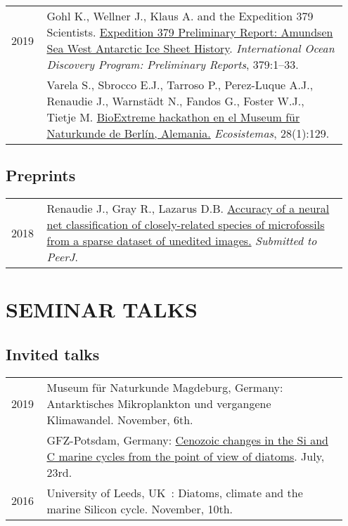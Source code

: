 \documentclass[11pt, a4paper]{article}
\makeatletter
\newcommand\fnoteref[1]{\protected@xdef\@theenmark{\ref{#1}}\@endnotemark}
\makeatother
\begin{document}
\begin{longtable}{@{}p{0.1\linewidth} P{0.85\linewidth}@{}}
2019 & Gohl K., Wellner J., Klaus A. and the Expedition 379 Scientists\fnoteref{exp379scientists}. \href{http://publications.iodp.org/preliminary_report/379/index.html}{Expedition 379 Preliminary Report: Amundsen Sea West Antarctic Ice Sheet History}. \textit{International Ocean Discovery Program: Preliminary Reports}, 379:1--33.\\
    & Varela S., Sbrocco E.J., Tarroso P., Perez-Luque A.J., Renaudie J., Warnst\"{a}dt N., Fandos G., Foster W.J., Tietje M. \href{http://dx.doi.org/10.7818/ECOS.1707}{BioExtreme hackathon en el Museum f\"{u}r Naturkunde de Berlín, Alemania.} \textit{Ecosistemas}, 28(1):129.\\
\end{longtable}

\subsection{Preprints}
\begin{longtable}{@{}p{0.1\linewidth} P{0.85\linewidth}@{}}
2018 & Renaudie J., Gray R., Lazarus D.B. \href{https://peerj.com/preprints/27328/}{Accuracy of a neural net classification of closely-related species of microfossils from a sparse dataset of unedited images.} \textit{Submitted to PeerJ}.\\
\end{longtable}

\section{SEMINAR TALKS}
\subsection{Invited talks}
\begin{longtable}{@{}p{0.1\linewidth} P{0.85\linewidth}@{}}
2019 & Museum f\"{u}r Naturkunde Magdeburg, Germany: Antarktisches Mikroplankton und vergangene Klimawandel. November, 6th.\\
    & GFZ-Potsdam, Germany: \href{http://plannapus.github.io/data/20190723Potsdam.pdf}{Cenozoic changes in the Si and C marine cycles from the point of view of diatoms}. July, 23rd.\\
2016 & University of Leeds, UK : Diatoms, climate and the marine Silicon cycle. November, 10th.\\
\end{longtable}
\end{document}
